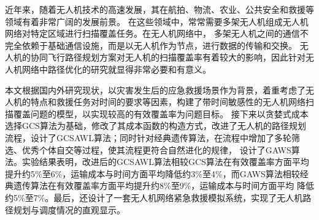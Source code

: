 \begin{cabstract}
  近年来，随着无人机技术的高速发展，其在航拍、物流、农业、公共安全和救援等领域有着非常广阔的发展前景。
  在这些领域中，常常需要多架无人机组成无人机网络对特定区域进行扫描覆盖任务。在无人机网络中，
  多架无人机之间的通信不完全依赖于基础通信设施，而是以无人机作为节点，进行数据的传输和交换。
  无人机的协同飞行路径规划方案对无人机的扫描覆盖率有着较大的影响，因此针对无人机网络中路径优化的研究就显得非常必要和有意义。


  本文根据国内外研究现状，以灾害发生后的应急救援场景作为背景，着重考虑了无人机的特点和救援任务对时间的要求等因素，构建了带时间敏感性的无人机网络扫描覆盖问题的模型，以实现较高的有效覆盖率为问题目标。
  接下来以贪婪式成本选择GCS算法\cite{2021Time}为基础，修改了其成本函数的构造方式，改进了无人机的路径规划流程，设计了GCSAWL算法；同时针对经典遗传算法，在流程中增加了多轮筛选、优秀个体自交等过程，使其流程更符合自然进化的规律，
  设计了GAWS算法。实验结果表明，改进后的GCSAWL算法相较GCS算法在有效覆盖率方面平均提升约5\%至6\%，运输成本与时间方面平均降低约3\%至4\%，而GAWS算法相较经典遗传算法在有效覆盖率方面平均提升约8\%至9\%，运输成本与时间方面平均
  降低约5\%至7\%。最后，还设计了一套无人机网络紧急救援模拟系统，实现了无人机路径规划与调度情况的直观显示。
  
\end{cabstract}


